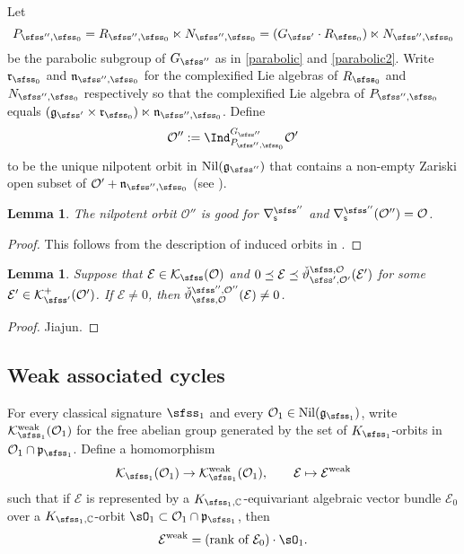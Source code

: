 \documentclass[12pt,a4paper]{amsart}
\newcommand{\CE}{{\mathcal {E}}}
\newcommand{\CK}{{\mathcal {K}}}
\newcommand{\CO}{{\mathcal {O}}}
\newcommand{\g}{\mathfrak g}
\newcommand{\p}{\mathfrak p}
\numberwithin{equation}{section}
\newtheorem{lem}[thm]{Lemma}
\theoremstyle{remark}
\begin{document}
Let 
\[
  P_{\sfss'',\sfss_0}=R_{\sfss'',\sfss_0}\ltimes N_{\sfss'',\sfss_0}=(G_{\sfss'}\cdot R_{\sfss_0})\ltimes N_{\sfss'',\sfss_0}
\]
be the parabolic subgroup of $G_{\sfss''}$ as in \eqref{parabolic} and \eqref{parabolic2}. Write $\mathfrak r_{\sfss_0}$ and $\mathfrak n_{\sfss'',\sfss_0}$ for the complexified Lie algebras of $R_{\sfss_0}$ and $N_{\sfss'',\sfss_0}$ respectively so that  the complexified Lie algebra of $P_{\sfss'', \sfss_0}$ equals $(\g_{\sfss'}\times \mathfrak r_{\sfss_0})\ltimes \mathfrak n_{\sfss'',\sfss_0}$.   
Define
\[
  \CO'':= \Ind_{P_{\sfss'',\sfss_0}}^{G_{\sfss''}}  \CO'%
\]
to be the unique nilpotent orbit in $\mathrm{Nil}(\g_{\sfss''})$ that contains a non-empty Zariski open subset of  $
  \CO'+\mathfrak n_{\sfss'',\sfss_0}$ (see \cite[Theorem 7.1.1]{CM}).


\begin{lem}
The nilpotent orbit $\CO''$ is good for  $\nabla_\mathsf s^{\sfss''}$ and $\nabla_\mathsf s^{\sfss''}(\CO'')=\CO$.  
\end{lem}
\begin{proof}
This follows from the description of induced orbits in \cite[Section 7.3]{CM}. 
\end{proof}


\begin{lem}\label{lem74}
Suppose that $\CE\in \CK_{\sfss}(\CO)$ and $0\preceq \CE\preceq \check \vartheta_{\sfss', \CO'}^{\sfss, \CO}(\CE')$ for some $\CE'\in \CK^+_{\sfss'}(\CO')$. If $\CE\neq 0$, then  $\check \vartheta_{\sfss, \CO}^{\sfss'', \CO''}(\CE)\neq 0$.
\end{lem}
\begin{proof}
Jiajun.
\end{proof}

\subsection{Weak associated cycles}

For every classical signature $\sfss_1$ and every $\CO_1\in \mathrm{Nil}(\g_{\sfss_1})$, write $\CK^{\mathrm{weak}}_{\sfss_1}(\CO_1)$
for the free abelian group generated by the set of $K_{\sfss_1}$-orbits in $\CO_1\cap \p_{\sfss_1}$. Define a homomorphism
\[
  \CK_{\sfss_1}(\CO_1)\rightarrow \CK^{\mathrm{weak}}_{\sfss_1}(\CO_1), \qquad \CE\mapsto \CE^{\mathrm{weak}}
\]
such that if $\CE$ is represented by a $K_{\sfss_1,\C}$-equivariant algebraic vector bundle $\CE_0$ over a $K_{\sfss_1,\C}$-orbit $\sO_1\subset \CO_1\cap \p_{\sfss_1}$, then
\[
   \CE^{\mathrm{weak}}=\textrm{(rank of $\CE_0$)}\cdot \sO_1. 
\]
\end{document}
